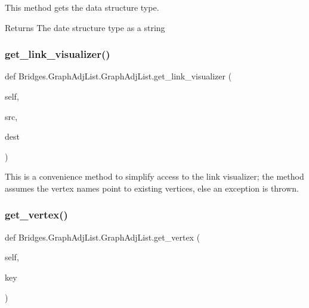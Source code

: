 This method gets the data structure type. 

\begin{DoxyReturn}{Returns}
The date structure type as a string 
\end{DoxyReturn}
\mbox{\label{class_bridges_1_1_graph_adj_list_1_1_graph_adj_list_a07dc3edba589c0323de1a88a89c85af2}} 
\subsubsection{\texorpdfstring{get\+\_\+link\+\_\+visualizer()}{get\_link\_visualizer()}}
{\footnotesize\ttfamily def Bridges.\+Graph\+Adj\+List.\+Graph\+Adj\+List.\+get\+\_\+link\+\_\+visualizer (\begin{DoxyParamCaption}\item[{}]{self,  }\item[{}]{src,  }\item[{}]{dest }\end{DoxyParamCaption})}



This is a convenience method to simplify access to the link visualizer; the method assumes the vertex names point to existing vertices, else an exception is thrown. 

\mbox{\label{class_bridges_1_1_graph_adj_list_1_1_graph_adj_list_a894ff2f4bf028ba18b1a6b64186ca73a}} 
\subsubsection{\texorpdfstring{get\+\_\+vertex()}{get\_vertex()}}
{\footnotesize\ttfamily def Bridges.\+Graph\+Adj\+List.\+Graph\+Adj\+List.\+get\+\_\+vertex (\begin{DoxyParamCaption}\item[{}]{self,  }\item[{}]{key }\end{DoxyParamCaption})}



